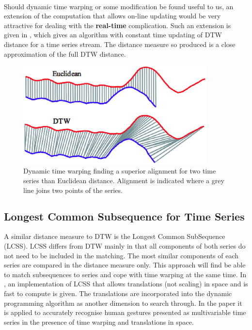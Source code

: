	\paragraph{}
	Should dynamic time warping or some modification be found useful to us, an extension of the computation that allows on-line updating would be very attractive for dealing with the \textbf{real-time} complication. Such an extension is given in \citep{capitani2007warping}, which gives an algorithm with constant time updating of DTW distance for a time series stream. The distance measure so produced is a close approximation of the full DTW distance.
	
	\begin{figure}[h!]
			\label{fig:dtwinaction}
	\centering
	\includegraphics[width=100mm]{images/dtw.eps}
	\caption{Dynamic time warping finding a superior alignment for two time series than Euclidean distance. Alignment is indicated where a grey line joins two points of the series.}
	\end{figure}

	\subsection{Longest Common Subsequence for Time Series}
	A similar distance measure to DTW is the Longest Common SubSequence (LCSS). LCSS differs from DTW mainly in that all components of both series do not need to be included in the matching. The most similar components of each series are compared in the distance measure only. This approach will find be able to match subsequences to series and cope with time warping at the same time. In \citep{vlachos2002discovering}, an implementation of LCSS that allows translations (not scaling) in space and is fast to compute is given. The translations are incorporated into the dynamic programming algorithm as another dimension to search through.  In the paper it is applied to accurately recognise human gestures presented as multivariable time series in the presence of time warping and translations in space.
